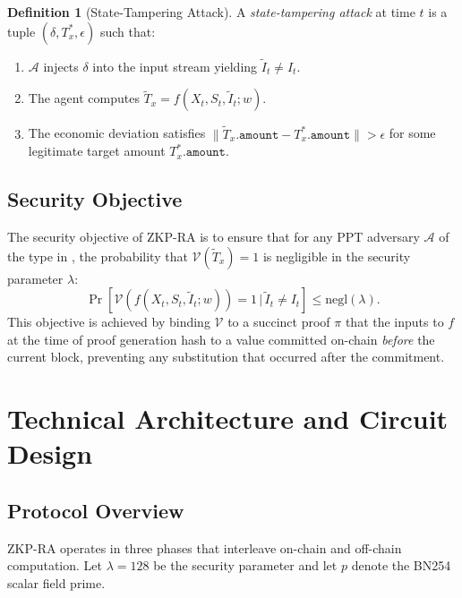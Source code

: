 \documentclass[final,5p,times,twocolumn]{elsarticle}
\theoremstyle{plain}
\theoremstyle{definition}
\newtheorem{definition}[theorem]{Definition}
\theoremstyle{remark}
\newcommand{\Adv}{\mathcal{A}}
\newcommand{\negl}{\mathrm{negl}}
\begin{document}
\begin{definition}[State-Tampering Attack]
\label{def:tampering}
A \emph{state-tampering attack} at time $t$ is a tuple
$(\delta, T_x^*, \epsilon)$ such that:
\begin{enumerate}
  \item $\Adv$ injects $\delta$ into the input stream yielding
        $\tilde{I}_t \neq I_t$.
  \item The agent computes $\tilde{T}_x = f(X_t, S_t, \tilde{I}_t; w)$.
  \item The economic deviation satisfies
        $\|\tilde{T}_x.\mathtt{amount} - T_x^*.\mathtt{amount}\| > \epsilon$
        for some legitimate target amount $T_x^*.\mathtt{amount}$.
\end{enumerate}
\end{definition}

\subsection{Security Objective}

The security objective of ZKP-RA is to ensure that for any PPT adversary
$\Adv$ of the type in , the probability that
$\mathcal{V}(\tilde{T}_x) = 1$ is negligible in the security parameter
$\lambda$:
\begin{equation}
  \Pr\!\left[\mathcal{V}\!\left(f\!\left(X_t, S_t, \tilde{I}_t; w\right)\right) = 1
    \,\Big|\, \tilde{I}_t \neq I_t \right] \leq \negl(\lambda).
  \label{eq:security_obj}
\end{equation}
This objective is achieved by binding $\mathcal{V}$ to a succinct proof
$\pi$ that the inputs to $f$ at the time of proof generation hash to a
value committed on-chain \emph{before} the current block, preventing any
substitution that occurred after the commitment.

\section{Technical Architecture and Circuit Design}
\label{sec:arch}

\subsection{Protocol Overview}

ZKP-RA operates in three phases that interleave on-chain and off-chain
computation. Let $\lambda = 128$ be the security parameter and let $p$ denote
the BN254 scalar field prime.
\end{document}
